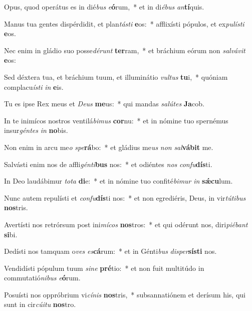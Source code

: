 \item Opus, quod operátus es in dié\textit{bus} \textit{e}\textbf{ó}rum,~* et in di\textit{é}\textit{bus} \textit{an}\textbf{tí}quis.
\item Manus tua gentes dispérdidit, et plan\textit{tás}\textit{ti} \textbf{e}os:~* afflixísti pópulos, et ex\textit{pu}\textit{lís}\textit{ti} \textbf{e}os.
\item Nec enim in gládio suo posse\textit{dé}\textit{runt} \textbf{ter}ram,~* et bráchium eórum non \textit{sal}\textit{vá}\textit{vit} \textbf{e}os:
\item Sed déxtera tua, et bráchium tuum, et illuminátio \textit{vul}\textit{tus} \textbf{tu}i,~* quóniam complacu\textit{ís}\textit{ti} \textit{in} \textbf{e}is.
\item Tu es ipse Rex meus et \textit{De}\textit{us} \textbf{me}us:~* qui mandas \textit{sa}\textit{lú}\textit{tes} \textbf{Ja}cob.
\item In te inimícos nostros ventilá\textit{bi}\textit{mus} \textbf{cor}nu:~* et in nómine tuo spernémus insur\textit{gén}\textit{tes} \textit{in} \textbf{no}bis.
\item Non enim in arcu me\textit{o} \textit{spe}\textbf{rá}bo:~* et gládius me\textit{us} \textit{non} \textit{sal}\textbf{vá}\textbf{bit} me.
\item Salvásti enim nos de affli\textit{gén}\textit{ti}\textbf{bus} nos:~* et odiéntes \textit{nos} \textit{con}\textit{fu}\textbf{dís}ti.
\item In Deo laudábimur \textit{to}\textit{ta} \textbf{di}e:~* et in nómine tuo confité\textit{bi}\textit{mur} \textit{in} \textbf{sǽ}\textbf{cu}lum.
\item Nunc autem repulísti et \textit{con}\textit{fu}\textbf{dís}ti nos:~* et non egrediéris, Deus, in vir\textit{tú}\textit{ti}\textit{bus} \textbf{nos}tris.
\item Avertísti nos retrórsum post ini\textit{mí}\textit{cos} \textbf{nos}tros:~* et qui odérunt nos, diri\textit{pi}\textit{é}\textit{bant} \textbf{si}bi.
\item Dedísti nos tamquam o\textit{ves} \textit{es}\textbf{cá}rum:~* et in Génti\textit{bus} \textit{di}\textit{sper}\textbf{sís}\textbf{ti} nos.
\item Vendidísti pópulum tuum \textit{si}\textit{ne} \textbf{pré}tio:~* et non fuit multitúdo in commutatió\textit{ni}\textit{bus} \textit{e}\textbf{ó}rum.
\item Posuísti nos oppróbrium vi\textit{cí}\textit{nis} \textbf{nos}tris,~* subsannatiónem et derísum his, qui sunt in cir\textit{cú}\textit{i}\textit{tu} \textbf{nos}tro.
